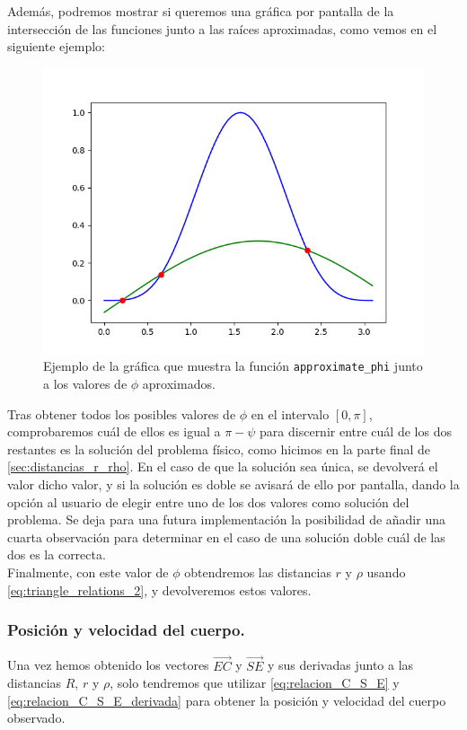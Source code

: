 \documentclass[11pt]{book}
\begin{document}
Además, podremos mostrar si queremos una gráfica por pantalla de la intersección de las funciones junto a las raíces aproximadas, como vemos en el siguiente ejemplo:

\begin{figure}[H]
\centering
\includegraphics[scale=0.6]{images/example_newton.png}
\caption{Ejemplo de la gráfica que muestra la función \texttt{approximate\_phi} junto a los valores de $\phi$ aproximados.}
\end{figure}

Tras obtener todos los posibles valores de $\phi$ en el intervalo $[0,\pi]$, comprobaremos cuál de ellos es igual a $\pi-\psi$ para discernir entre cuál de los dos restantes es la solución del problema físico, como hicimos en la parte final de \ref{sec:distancias_r_rho}. En el caso de que la solución sea única, se devolverá el valor dicho valor, y si la solución es doble se avisará de ello por pantalla, dando la opción al usuario de elegir entre uno de los dos valores como solución del problema. Se deja para una futura implementación la posibilidad de añadir una cuarta observación para determinar en el caso de una solución doble cuál de las dos es la correcta.\\

Finalmente, con este valor de $\phi$ obtendremos las distancias $r$ y $\rho$ usando \eqref{eq:triangle_relations_2}, y devolveremos estos valores.\\

\subsubsection{Posición y velocidad del cuerpo.}
Una vez hemos obtenido los vectores $\overrightarrow{EC}$ y $\overrightarrow{SE}$ y sus derivadas junto a las distancias $R$, $r$ y $\rho$, solo tendremos que utilizar \eqref{eq:relacion_C_S_E} y \eqref{eq:relacion_C_S_E_derivada} para obtener la posición y velocidad del cuerpo observado.\\
\end{document}
